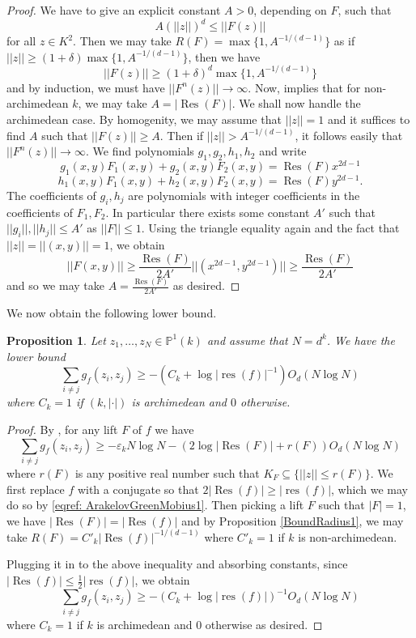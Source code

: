 \documentclass[10pt]{amsart}
\newcommand{\bb}{\mathbb}
\newcommand{\Res}{\operatorname{Res}}
\newcommand{\res}{\operatorname{res}}
\newcommand{\eps}{\varepsilon}
\numberwithin{theorem}{section}
\newtheorem{proposition}[theorem]{Proposition}
\numberwithin{example}{section}
\numberwithin{definition}{section}
\begin{document}
\begin{proof}
We have to give an explicit constant $A > 0$, depending on $F$, such that 
$$A(||z||)^d \leq ||F(z)||$$
for all $z \in K^2$. Then we may take $R(F) = \max\{1,A^{-1/(d-1)}\}$ as if $||z|| \geq (1+\delta)\max\{1,A^{-1/(d-1)}\}$, then we have 
$$||F(z)|| \geq (1+\delta)^d \max\{1,A^{-1/(d-1)}\}$$
and by induction, we must have $||F^n(z)|| \to \infty$. Now, \cite[Remark 3.3]{Bak09} implies that for non-archimedean $k$, we may take $A = |\Res(F)|$. We shall now handle the archimedean case. By homogenity, we may assume that $||z|| = 1$ and it suffices to find $A$ such that $||F(z)|| \geq A$. Then if $||z|| > A^{-1/(d-1)}$, it follows easily that $||F^n(z)|| \to \infty$. We find polynomials $g_1,g_2,h_1,h_2$ and write 
$$g_1(x,y) F_1(x,y) + g_2(x,y) F_2(x,y) = \Res(F) x^{2d-1}$$
$$h_1(x,y) F_1(x,y) + h_2(x,y) F_2(x,y) = \Res(F) y^{2d-1}.$$
The coefficients of $g_i,h_j$ are polynomials with integer coefficients in the coefficients of $F_1,F_2$. In particular there exists some constant $A'$ such that $||g_i||,||h_j|| \leq A'$ as $||F|| \leq 1$. Using the triangle equality again and the fact that $||z|| = ||(x,y)|| = 1$, we obtain 
$$||F(x,y)|| \geq \frac{\Res(F)}{2A'} ||(x^{2d-1}, y^{2d-1})|| \geq \frac{\Res(F)}{2A'}$$
and so we may take $A = \frac{\Res(F)}{2A'}$ as desired. 
\end{proof}

We now obtain the following lower bound.

\begin{proposition} \label{ArakelovSumLowerBound1}
Let $z_1,\ldots,z_N \in \bb{P}^1(k)$ and assume that $N = d^k$. We have the lower bound 
$$\sum_{i \not = j} g_f(z_i,z_j) \geq -(C_k + \log |\res(f)|^{-1}) O_d (N \log N)$$
where $C_k = 1$ if $(k, | \cdot |)$ is archimedean and $0$ otherwise.
\end{proposition}

\begin{proof}
By \cite[Corollary 2.3]{Bak09}, for any lift $F$ of $f$ we have 
$$\sum_{i \not = j} g_f(z_i,z_j) \geq - \eps_k N \log N - (2 \log |\Res(F)| + r(F)) O_d(N \log N)$$
where $r(F)$ is any positive real number such that $K_F \subseteq \{ ||z|| \leq r(F)\}$. We first replace $f$ with a conjugate so that $2 |\Res(f)| \geq |\res(f)|$, which we may do so by \eqref{eqref: ArakelovGreenMobius1}. Then picking a lift $F$ such that $|F| = 1$, we have $|\Res(F)| = |\Res(f)|$ and by Proposition \ref{BoundRadius1}, we may take $R(F) = C'_k |\Res(f)|^{-1/(d-1)}$ where $C'_k = 1$ if $k$ is non-archimedean. 
\par 
Plugging it in to the above inequality and absorbing constants, since $|\Res(f)| \leq \frac{1}{2} |\res(f)|$, we obtain 
$$\sum_{i \not = j} g_f(z_i,z_j) \geq -(C_k + \log |\res(f)|)^{-1} O_d(N \log N)$$
where $C_k = 1$ if $k$ is archimedean and $0$ otherwise as desired.
\end{proof}
\end{document}
